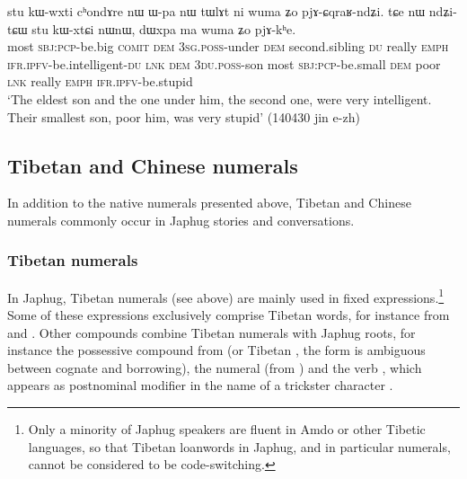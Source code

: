 \begin{exe}
\ex  \label{ex:Wpa.nW}
\gll stu kɯ-wxti cʰondɤre nɯ ɯ-pa nɯ tɯlɤt ni wuma ʑo pjɤ-ɕqraʁ-ndʑi. tɕe nɯ ndʑi-tɕɯ stu kɯ-xtɕi nɯnɯ, dɯxpa ma wuma ʑo pjɤ-kʰe. \\
most \textsc{sbj}:\textsc{pcp}-be.big \textsc{comit} \textsc{dem} \textsc{3sg}.\textsc{poss}-under \textsc{dem} second.sibling \textsc{du} really \textsc{emph} \textsc{ifr}.\textsc{ipfv}-be.intelligent-\textsc{du} \textsc{lnk} \textsc{dem} \textsc{3du}.\textsc{poss}-son most \textsc{sbj}:\textsc{pcp}-be.small \textsc{dem} poor \textsc{lnk} really \textsc{emph} \textsc{ifr}.\textsc{ipfv}-be.stupid \\
\glt `The eldest son and the one under him, the second one, were very intelligent. Their smallest son, poor him, was very stupid' (140430 jin e-zh) 
\end{exe}
 
\subsection{Tibetan and Chinese numerals}  
In addition to the native numerals presented above, Tibetan and Chinese numerals commonly occur in Japhug stories and conversations.

 \subsubsection{Tibetan numerals} \label{sec:tibetan.numerals}
 
In Japhug, Tibetan numerals (see  above) are mainly used in fixed expressions.\footnote{Only a minority of Japhug speakers are fluent in Amdo or other Tibetic languages, so that Tibetan loanwords in Japhug, and in particular numerals, cannot be considered to be code-switching. 
} Some of these expressions exclusively comprise Tibetan words, for instance  from  and .  Other compounds combine Tibetan numerals with Japhug roots, for instance the possessive compound from  (or Tibetan , the form is ambiguous between cognate and borrowing), the numeral  (from  ) and the verb , which appears as postnominal modifier in the name of a trickster character .
 
